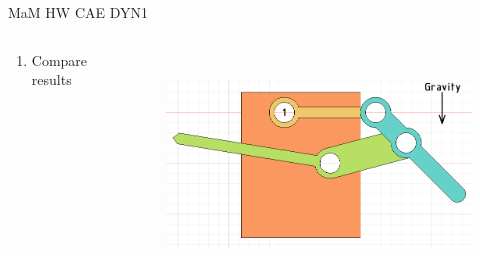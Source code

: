 \documentclass[aspectratio=169]{beamer}
\begin{document}
\begin{frame}[t]{MaM HW CAE DYN1}
\begin{columns}[T,onlytextwidth]
\begin{column}{0.59\textwidth}
\begin{enumerate}
            \item Compare results
        \end{enumerate}
            \end{column}
            \begin{column}{0.39\textwidth}
                \vspace{1cm}
                \begin{figure}[H]
                    \centering\includegraphics[height=6cm,width=1\textwidth,keepaspectratio]{task_descr.png}
                    \label{fig:task_descr.png}
                \end{figure}
            \end{column}
        \end{columns}
    \end{frame}
\end{document}

